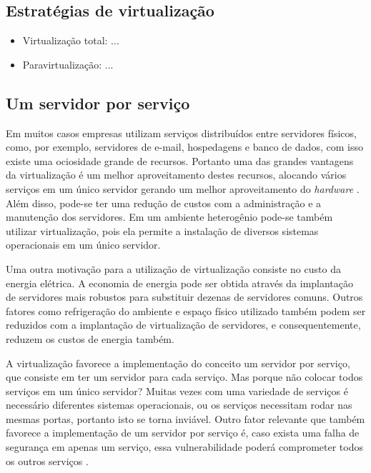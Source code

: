 \subsection{Estratégias de virtualização}
\label{section:virtestrat}

\begin{itemize}
 \item Virtualização total: ...
 \item Paravirtualização: ...
\end{itemize}

\subsection{Um servidor por serviço}
\label{section:virtserv}

Em muitos casos empresas utilizam serviços distribuídos entre servidores físicos, como, por exemplo, servidores de e-mail, hospedagens e 
banco de dados, com isso existe uma ociosidade grande de recursos. Portanto uma das grandes vantagens da virtualização é um melhor 
aproveitamento destes recursos, alocando vários serviços em um único servidor gerando um melhor aproveitamento do \textit{hardware} 
\cite{moreira2006}. Além disso, pode-se ter uma redução de custos com a administração e a manutenção dos servidores. Em um ambiente 
heterogênio pode-se também utilizar virtualização, pois ela permite a instalação de diversos sistemas operacionais em um único servidor.

Uma outra motivação para a utilização de virtualização consiste no custo da energia elétrica. A economia de energia pode ser obtida através 
da implantação de servidores mais robustos para substituir dezenas de servidores comuns. Outros fatores como refrigeração do ambiente e 
espaço físico utilizado também podem ser reduzidos com a implantação de virtualização de servidores, e consequentemente, reduzem os 
custos de energia também.

A virtualização favorece a implementação do conceito um servidor por serviço, que consiste em ter um servidor para cada serviço.
Mas porque não colocar todos serviços em um único servidor? Muitas vezes com uma variedade de serviços é necessário diferentes 
sistemas operacionais, ou os serviços necessitam rodar nas mesmas portas, portanto isto se torna inviável. Outro fator relevante que 
também favorece a implementação de um servidor por serviço é, caso exista uma falha de segurança em apenas um serviço, essa 
vulnerabilidade poderá comprometer todos os outros serviços \cite{carissimi2008}.


